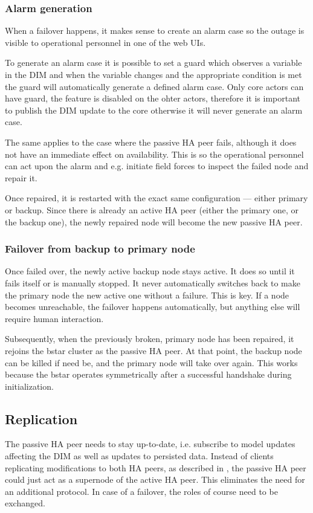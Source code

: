 \subsubsection{Alarm generation}
When a failover happens, it makes sense to create an alarm case
so the outage is visible to operational personnel in one of the web UIs.

To generate an alarm case it is possible to set a guard which observes
a variable in the DIM and when the variable changes and the appropriate 
condition is met the guard will automatically generate a defined alarm case.
Only core actors can have guard, the feature is disabled on the ohter actors,
therefore it is important to publish the DIM update to the core otherwise
it will never generate an alarm case.

The same applies to the case where the passive HA peer fails, although it
does not have an immediate effect on availability.  This is so the operational
personnel can act upon the alarm and e.g. initiate field forces to inspect the
failed node and repair it.

Once repaired, it is restarted with the exact same configuration --- either primary
or backup. Since there is already an active HA peer (either the primary one,
or the backup one), the newly repaired node will become the new passive HA peer.

\subsubsection{Failover from backup to primary node}
Once failed over, the newly active backup node stays active. It does so until it
fails itself or is manually stopped. It never automatically switches back to
make the primary node the new active one without a failure. This is key. If a
node becomes unreachable, the failover happens automatically, but anything else will
require human interaction.

Subsequently, when the previously broken, primary node has been repaired, it
rejoins the \gls{bstar} cluster as the passive HA peer. At that point, the backup
node can be killed if need be, and the primary node will take over again.  This
works because the \gls{bstar} operates symmetrically after a successful
handshake during initialization.

\subsection{Replication}
The passive HA peer needs to stay up-to-date, i.e. subscribe to model updates
affecting the DIM as well as updates to persisted data.
Instead of clients replicating modifications to both HA peers, as
described in \cite[Chapter 5 - Advanced Pub-Sub Patterns, The Clustered Hashmap
Protocol]{zmq:zguide}, the passive HA peer could just act as a supernode of the
active HA peer. This eliminates the need for an additional protocol. In case of
a failover, the roles of course need to be exchanged.

